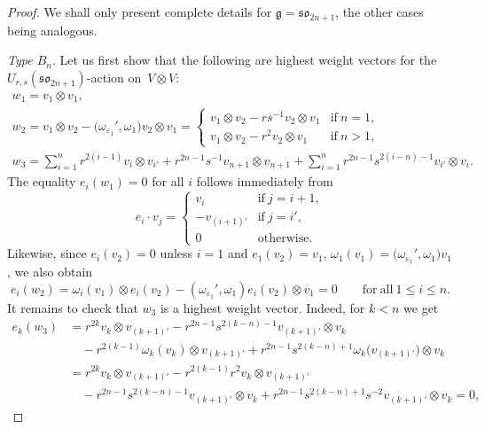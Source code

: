 \documentclass[10pt,a4paper]{amsart}
\numberwithin{equation}{section}
\newcommand{\sso}{\mathfrak{so}}
\begin{document}
\begin{proof}
We shall only present complete details for $\mathfrak{g} = \mathfrak{so}_{2n + 1}$, the other cases being analogous.

\textit{Type $B_n$}.
Let us first show that the following are highest weight vectors for the $U_{r,s}(\sso_{2n+1})$-action on~${V \otimes V}$:
\begin{gather}
 w_{1} = v_{1} \otimes v_{1}, \nonumber\\
 w_{2} = v_{1} \otimes v_{2} - \bigl(\omega_{\varepsilon_{1}}',\omega_{1}\bigr)v_{2} \otimes v_{1} =
 \begin{cases}
 v_{1} \otimes v_{2} - rs^{-1}v_{2} \otimes v_{1} & \text{if}\ n = 1, \\
 v_{1} \otimes v_{2} - r^2 v_{2} \otimes v_{1} & \text{if}\ n > 1 ,
 \end{cases} \nonumber\\
 w_{3} = \sum_{i=1}^{n} r^{2(i - 1)}v_{i} \otimes v_{i'} + r^{2n - 1}s^{-1}v_{n + 1}\otimes v_{n+1} +
 \sum_{i = 1}^{n}r^{2n - 1}s^{2(i - n) - 1}v_{i'} \otimes v_{i}.\label{eq:B_hwv}
\end{gather}
The equality $e_{i}(w_{1})=0$ for all $i$ follows immediately from
\[
 e_{i}\cdot v_{j} =
 \begin{cases}
 v_{i} & \text{if}\ j = i + 1 ,\\
 -v_{(i + 1)'} & \text{if}\ j = i', \\
 0 & \text{otherwise}.
 \end{cases}
\]
Likewise, since $e_{i}(v_{2})=0$ unless $i=1$ and $e_1(v_2)=v_1$, $\omega_1(v_1)=\bigl(\omega_{\varepsilon_{1}}',\omega_{1}\bigr)v_1$, we also obtain
\[
 e_{i}(w_{2}) =
 \omega_{i}(v_{1}) \otimes e_{i}(v_{2}) - (\omega_{\varepsilon_{1}}',\omega_{1}) e_{i}(v_{2}) \otimes v_{1} = 0
 \qquad \mathrm{for\ all} \ 1\leq i\leq n.
\]
It remains to check that $w_3$ is a highest weight vector. Indeed, for $k<n$ we get
\begin{align*}
 e_{k}(w_{3})&{}=
 r^{2k}v_{k}\otimes v_{(k+1)'} - r^{2n-1}s^{2(k-n)-1} v_{(k+1)'}\otimes v_{k}
 \\
 &\quad{}- r^{2(k-1)} \omega_k(v_{k})\otimes v_{(k+1)'} + r^{2n-1}s^{2(k-n)+1} \omega_k\bigl(v_{(k + 1)'}\bigr) \otimes v_{k} \\
 &{}= r^{2k}v_{k} \otimes v_{(k + 1)'} - r^{2(k - 1)}r^{2}v_{k} \otimes v_{(k + 1)'} \\
 &\quad{}-
 r^{2n - 1}s^{2(k - n)-1}v_{(k + 1)'} \otimes v_{k} + r^{2n - 1}s^{2(k - n) + 1}s^{-2}v_{(k + 1)'} \otimes v_{k} = 0,
\end{align*}

\end{proof}
\end{document}
